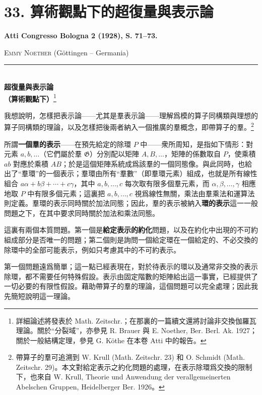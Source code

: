 \documentclass[11pt]{article}
\newcommand{\srcemph}[1]{\textbf{#1}}
\newcommand{\srctextsc}[1]{\textbf{#1}}
\begin{document}
\setcounter{footnote}{0}
\section*{33. 算術觀點下的超復量與表示論}
\srcemph{Atti Congresso Bologna 2 (1928), S. 71--73.}

\begingroup
\renewcommand{\thefootnote}{(\arabic{footnote})}

\begin{center}
\textsc{Emmy Noether} (Göttingen -- Germania)\\[-0.1em]
\rule{3em}{0.4pt}\\[0.8em]
\srctextsc{超復量與表示論}\\
\srctextsc{（算術觀點下）}\footnote{詳細論述將發表於 Math. Zeitschr.；在那裏的一篇續文還將討論非交換伽羅瓦理論。關於“分裂域”，亦參見 R. Brauer 與 E. Noether, Ber. Berl. Ak. 1927；關於一般結構定理，參見 G. Köthe 在本卷 Atti 中的報告。}
\end{center}

我想說明，怎樣把表示論——尤其是羣表示論——理解爲模的算子同構類與理想的算子同構類的理論，以及怎樣把後兩者納入一個推廣的羣概念，即帶算子的羣。\footnote{帶算子的羣可追溯到 W. Krull (Math. Zeitschr. 23) 和 O. Schmidt (Math. Zeitschr. 29)。本文對給定表示之約化問題的處理，在表示除環爲交換的限制下，也來自 W. Krull, Theorie und Anwendung der verallgemeinerten Abelschen Gruppen, Heidelberger Ber. 1926。}

所謂\srcemph{一個羣的表示}——在預先給定的除環 $P$ 中——衆所周知，是指如下情形：對元素 $a,b,\ldots$（它們屬於羣 $\mathfrak{G}$）分別配以矩陣 $A,B,\ldots$，矩陣的係數取自 $P$，使乘積 $ab$ 對應於乘積 $AB$；於是這個矩陣系統成爲該羣的一個同態像。與此同時，也給出了“羣環”的一個表示；羣環由所有“羣數”（即羣環元素）組成，也就是所有線性組合 $a\alpha+b\beta+\cdots+c\gamma$，其中 $a,b,\ldots,c$ 每次取有限多個羣元素，而 $\alpha,\beta,\ldots,\gamma$ 相應地取 $P$ 中有限多個元素；這裏把 $a,b,\ldots,c$ 視爲線性無關，乘法由羣乘法和運算法則定義。羣環的表示同時關於加法同態；因此，羣的表示被納入\srcemph{環的表示}這一一般問題之下，在其中要求同時關於加法和乘法同態。

這裏有兩個本質問題。第一個是\srcemph{給定表示的約化}問題，以及在約化中出現的不可約組成部分是否唯一的問題；第二個則是詢問一個給定環在一個給定的、不必交換的除環中的全部可能表示，例如只考慮其中的不可約表示。

第一個問題遠爲簡單；這一點已經表現在，對於待表示的環以及通常非交換的表示除環，都不需要任何特殊假設。表示由固定階數的矩陣給出這一事實，已經提供了一切必要的有限性假設。藉助帶算子的羣的理論，這個問題可以完全處理；因此我先簡短說明這一理論。
\end{document}
